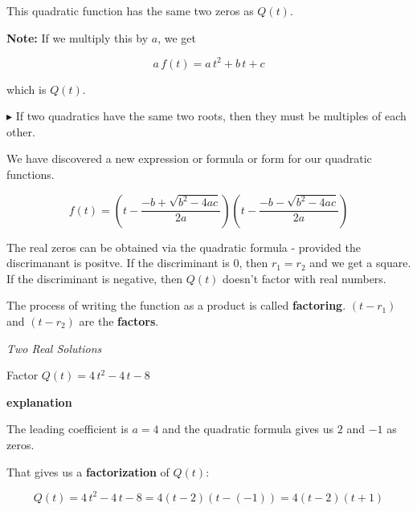 \documentclass{ximera}
\begin{document}
This quadratic function has the same two zeros as $Q(t)$.  


\textbf{Note:} If we multiply this by $a$, we get 


\[ a \, f(t) = a \, t^2 + b \, t + c \]

which is $Q(t)$.


$\blacktriangleright$ If two quadratics have the same two roots, then they must be multiples of each other.






We have discovered a new expression or formula or form for our quadratic functions.





\[ f(t) =  \left(t - \frac{-b + \sqrt{b^2 - 4 a c}}{2a}\right)   \left(t -  \frac{-b - \sqrt{b^2 - 4 a c}}{2a}\right)   \]



















The real zeros can be obtained via the quadratic formula - provided the discrimanant is positve.  If the discriminant is $0$, then $r_1 = r_2$ and we get a square.  If the discriminant is negative, then $Q(t)$ doesn't factor with real numbers.  


The process of writing the function as a product is called \textbf{factoring}. $(t - r_1)$  and $(t - r_2)$ are the \textbf{factors}.



\begin{example} \textit{Two Real Solutions} 

Factor $Q(t) = 4 \, t^2 - 4 \, t - 8$ 


\textbf{explanation}


The leading coefficient is $a=4$ and the quadratic formula gives us $2$ and $-1$ as zeros.  

That gives us a \textbf{factorization} of $Q(t)$:



\[    Q(t) = 4 \, t^2 - 4 \, t - 8 =  4 (t-2)(t-(-1))    = 4 (t-2)(t+1)         \]



\end{example}
\end{document}
